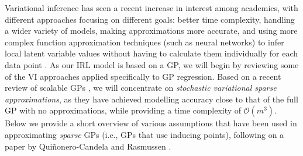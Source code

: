 \documentclass{mprop}
\theoremstyle{definition}
\begin{document}

Variational inference has seen a recent increase in interest among academics,
with different approaches focusing on different goals: better time complexity,
handling a wider variety of models, making approximations more accurate, and
using more complex function approximation techniques (such as neural networks)
to infer local latent variable values without having to calculate them
individually for each data point \cite{DBLP:journals/corr/abs-1711-05597}. As
our IRL model is based on a GP, we will begin by reviewing some of the VI
approaches applied specifically to GP regression. Based on a recent review of
scalable GPs \cite{DBLP:journals/corr/abs-1711-05597}, we will concentrate on
\emph{stochastic variational sparse approximations}, as they have achieved
modelling accuracy close to that of the full GP with no approximations, while
providing a time complexity of $\mathcal{O}(m^3)$. Below we provide a short
overview of various assumptions that have been used in approximating
\emph{sparse} GPs (i.e., GPs that use inducing points), following on a paper by
Qui\~{n}onero-Candela and Rasmussen \cite{DBLP:journals/jmlr/CandelaR05}.
\end{document}
